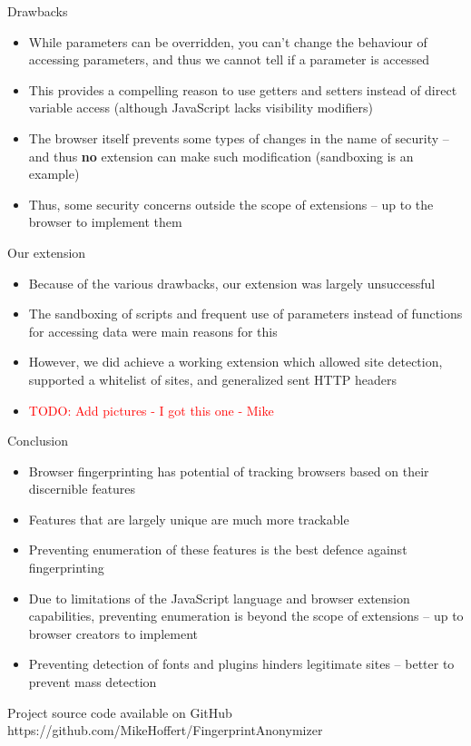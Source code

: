 \begin{frame}[fragile,t]{Drawbacks}
	\begin{itemize}
		\item While parameters can be overridden, you can't change the behaviour of accessing parameters, and thus we cannot tell if a parameter is accessed
		\item This provides a compelling reason to use getters and setters instead of direct variable access (although JavaScript lacks visibility modifiers)
		\item The browser itself prevents some types of changes in the name of security -- and thus \textbf{no} extension can make such modification (sandboxing is an example)
		\item Thus, some security concerns outside the scope of extensions -- up to the browser to implement them
	\end{itemize}
\end{frame}

\begin{frame}[fragile,t]{Our extension}
	\begin{itemize}
		\item Because of the various drawbacks, our extension was largely unsuccessful
		\item The sandboxing of scripts and frequent use of parameters instead of functions for accessing data were main reasons for this
		\item However, we did achieve a working extension which allowed site detection, supported a whitelist of sites, and generalized sent HTTP headers
		\item \textcolor{red}{TODO: Add pictures - I got this one - Mike}
	\end{itemize}
\end{frame}

\begin{frame}[fragile,t]{Conclusion}
	\begin{itemize}
		\item Browser fingerprinting has potential of tracking browsers based on their discernible features
		\item Features that are largely unique are much more trackable
		\item Preventing enumeration of these features is the best defence against fingerprinting
		\item Due to limitations of the JavaScript language and browser extension capabilities, preventing enumeration is beyond the scope of extensions -- up to browser creators to implement
		\item Preventing detection of fonts and plugins hinders legitimate sites -- better to prevent mass detection
	\end{itemize}
\end{frame}

\begin{frame}[plain]
	\begin{block}{Project source code available on GitHub}
		https://github.com/MikeHoffert/FingerprintAnonymizer
	\end{block}
\end{frame}
\addtocounter{framenumber}{-1}

